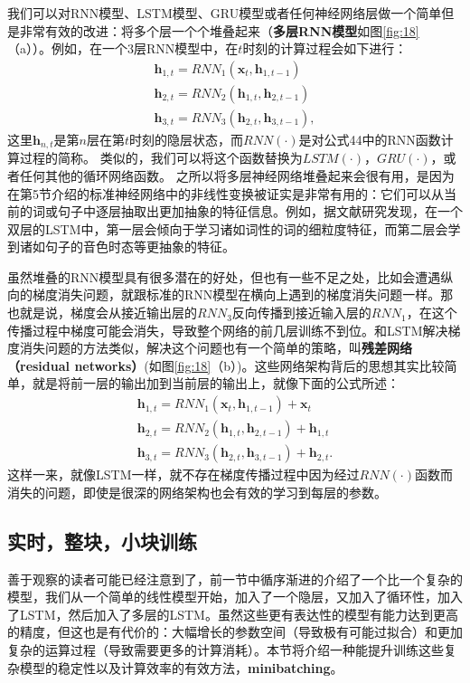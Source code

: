\documentclass[10pt,a4paper]{ctexart}
\begin{document}
我们可以对RNN模型、LSTM模型、GRU模型或者任何神经网络层做一个简单但是非常有效的改进：将多个层一个个堆叠起来（\textbf{多层RNN模型}如图\ref{fig:18}（a））。例如，在一个3层RNN模型中，在$t$时刻的计算过程会如下进行：
\[
 \begin{array}{l}
 \textbf{h}_{1,t} = RNN_1 (\textbf{x}_t,\textbf{h}_{1,t-1}) \\
 \textbf{h}_{2,t} = RNN_2 (\textbf{h}_{1,t},\textbf{h}_{2,t-1}) \\
 \textbf{h}_{3,t} = RNN_3 (\textbf{h}_{2,t},\textbf{h}_{3,t-1}),
 \end{array}
\]
这里$\textbf{h}_{n,t}$是第$n$层在第$t$时刻的隐层状态，而$RNN(\cdot)$是对公式44中的RNN函数计算过程的简称。
类似的，我们可以将这个函数替换为$LSTM(\cdot)$，$GRU(\cdot)$，或者任何其他的循环网络函数。
之所以将多层神经网络堆叠起来会很有用，是因为在第5节介绍的标准神经网络中的非线性变换被证实是非常有用的：它们可以从当前的词或句子中逐层抽取出更加抽象的特征信息。例如，据文献\cite{shi2016does}研究发现，在一个双层的LSTM中，第一层会倾向于学习诸如词性的词的细粒度特征，而第二层会学到诸如句子的音色时态等更抽象的特征。

虽然堆叠的RNN模型具有很多潜在的好处，但也有一些不足之处，比如会遭遇纵向的梯度消失问题，就跟标准的RNN模型在横向上遇到的梯度消失问题一样。那也就是说，梯度会从接近输出层的$RNN_3$反向传播到接近输入层的$RNN_1$，在这个传播过程中梯度可能会消失，导致整个网络的前几层训练不到位。和LSTM解决梯度消失问题的方法类似，解决这个问题也有一个简单的策略，叫\textbf{残差网络（residual networks）}(如图\ref{fig:18}（b）)\cite{he2016deep}。这些网络架构背后的思想其实比较简单，就是将前一层的输出加到当前层的输出上，就像下面的公式所述：
\[
 \begin{array}{l}
 \textbf{h}_{1,t} = RNN_1 (\textbf{x}_t,\textbf{h}_{1,t-1}) + \textbf{x}_t \\
 \textbf{h}_{2,t} = RNN_2 (\textbf{h}_{1,t},\textbf{h}_{2,t-1}) + \textbf{h}_{1,t} \\
 \textbf{h}_{3,t} = RNN_3 (\textbf{h}_{2,t},\textbf{h}_{3,t-1}) + \textbf{h}_{2,t}.
 \end{array}
\]
这样一来，就像LSTM一样，就不存在梯度传播过程中因为经过$RNN(\cdot)$函数而消失的问题，即使是很深的网络架构也会有效的学习到每层的参数。

\subsection{实时，整块，小块训练}
善于观察的读者可能已经注意到了，前一节中循序渐进的介绍了一个比一个复杂的模型，我们从一个简单的线性模型开始，加入了一个隐层，又加入了循环性，加入了LSTM，然后加入了多层的LSTM。虽然这些更有表达性的模型有能力达到更高的精度，但这也是有代价的：大幅增长的参数空间（导致极有可能过拟合）和更加复杂的运算过程（导致需要更多的计算消耗）。本节将介绍一种能提升训练这些复杂模型的稳定性以及计算效率的有效方法，\textbf{minibatching}。
\end{document}
